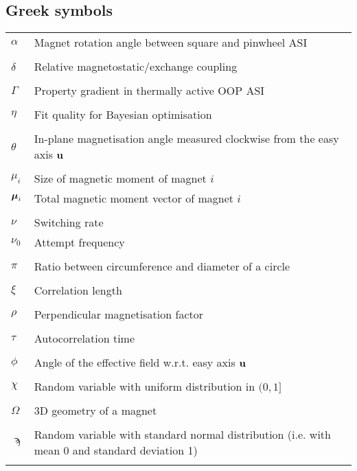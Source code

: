 \subsection*{Greek symbols}
\begin{longtable}[l]{p{60pt} p{350pt}}
	$\alpha$ & Magnet rotation angle between square and pinwheel ASI \\
	&\\

	$\delta$ & Relative magnetostatic/exchange coupling \\
	&\\

	$\Gamma$ & Property gradient in thermally active OOP ASI \\
	&\\
	
	$\eta$ & Fit quality for Bayesian optimisation \\
	&\\

	$\theta$ & In-plane magnetisation angle measured clockwise from the easy axis $\boldsymbol{\mathbf{u}}$ \\
	&\\

	$\mu_i$ & Size of magnetic moment of magnet $i$ \\
	$\boldsymbol{\mathbf{\mu}}_i$ & Total magnetic moment vector of magnet $i$ \\
	&\\
	
	$\nu$ & Switching rate \\
	$\nu_0$ & Attempt frequency \\
	&\\
	
	$\pi$ & Ratio between circumference and diameter of a circle \\
	&\\
	
	$\xi$ & Correlation length \\
	&\\

	$\rho$ & Perpendicular magnetisation factor \\
	&\\

	$\tau$ & Autocorrelation time \\
	&\\

	$\phi$ & Angle of the effective field w.r.t. easy axis $\boldsymbol{\mathbf{u}}$ \\
	&\\

	$\chi$ & Random variable with uniform distribution in $(0, 1]$ \\
	&\\
	
	$\Omega$ & 3D geometry of a magnet \\
	&\\
	
	$\sampi$ & Random variable with standard normal distribution (i.e. with mean 0 and standard deviation 1) \\
	&\\
\end{longtable}

